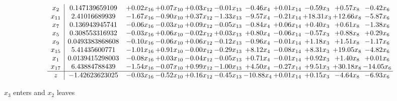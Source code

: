 \documentclass[9pt]{article}
\begin{document}
 \[\begin{array}{c| c c@{\hskip 2pt} c@{\hskip 2pt} c@{\hskip 2pt} c@{\hskip 2pt} c@{\hskip 2pt} c@{\hskip 2pt} c@{\hskip 2pt} c@{\hskip 2pt} c@{\hskip 2pt} }
 x_{2}   &  0.147139659109 & +  0.02 x_{16} & +  0.07 x_{10} & +  0.03 x_{12} & -0.01 x_{13} & -0.46 x_{4} & +  0.01 x_{14} & -0.59 x_{3} & +  0.57 x_{8} & -0.42 x_{6}\\
 x_{11}   &  2.41016689939 & -1.67 x_{16} & -0.90 x_{10} & +  0.37 x_{12} & -1.33 x_{13} & -9.57 x_{4} & -0.21 x_{14} & + 18.31 x_{3} & + 12.66 x_{8} & -5.87 x_{6}\\
 x_{7}   &  0.136943945741 & -0.06 x_{16} & -0.03 x_{10} & +  0.09 x_{12} & -0.05 x_{13} & -0.84 x_{4} & +  0.06 x_{14} & +  0.40 x_{3} & +  0.61 x_{8} & -1.38 x_{6}\\
 x_{5}   &  0.308553316932 & -0.03 x_{16} & +  0.06 x_{10} & -0.02 x_{12} & +  0.03 x_{13} & +  0.80 x_{4} & -0.06 x_{14} & -0.57 x_{3} & +  0.88 x_{8} & +  0.29 x_{6}\\
 x_{9}   &  0.0493383868608 & -0.10 x_{16} & -0.06 x_{10} & +  0.06 x_{12} & -0.12 x_{13} & -0.96 x_{4} & -0.01 x_{14} & +  1.18 x_{3} & +  1.51 x_{8} & -1.17 x_{6}\\
 x_{15}   &  5.41435600771 & -1.01 x_{16} & +  0.91 x_{10} & -0.00 x_{12} & -0.29 x_{13} & +  8.12 x_{4} & -0.08 x_{14} & +  8.31 x_{3} & + 19.05 x_{8} & -4.82 x_{6}\\
 x_{1}   &  0.0139415298003 & -0.08 x_{16} & +  0.03 x_{10} & -0.04 x_{12} & -0.05 x_{13} & +  0.71 x_{4} & -0.01 x_{14} & +  0.92 x_{3} & +  1.40 x_{8} & +  0.01 x_{6}\\
 x_{17}   &  6.43884788439 & -1.54 x_{16} & -0.07 x_{10} & +  0.99 x_{12} & -1.00 x_{13} & +  4.50 x_{4} & -0.27 x_{14} & +  9.51 x_{3} & + 30.18 x_{8} & -14.05 x_{6}\\
\hline
z    &  -1.42623623025 & -0.03 x_{16} & -0.52 x_{10} & +  0.16 x_{12} & -0.45 x_{13} & -10.88 x_{4} & +  0.01 x_{14} & +  0.15 x_{3} & -4.64 x_{8} & -6.93 x_{6}\\
\end{array}\]


 $ x_{3} $ enters and $ x_{2} $ leaves 
\end{document}
